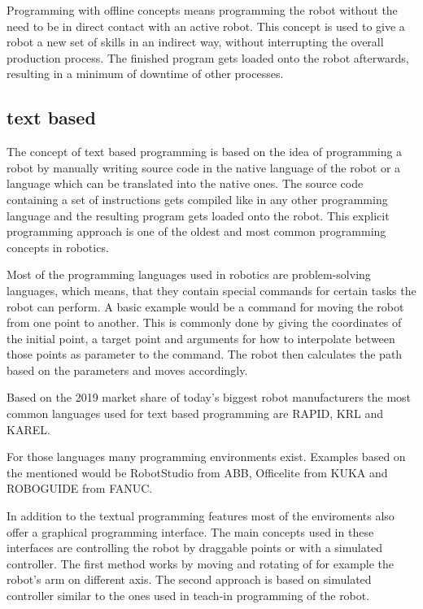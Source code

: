 \documentclass[conference]{IEEEtran}
\begin{document}
    Programming with offline concepts means programming the robot without the need to be in direct contact with an active robot. This concept is used to give a robot a new set of skills in an indirect way, without interrupting the overall production process.
    The finished program gets loaded onto the robot afterwards, resulting in a minimum of downtime of other processes. \cite[p. 186]{b4}

    \subsection{text based}

        The concept of text based programming is based on the idea of programming a robot by manually writing source code in the native language of the robot or a language which can be translated into the native ones. The source code containing a set of instructions gets compiled like in any other programming language and the resulting program gets loaded onto the robot. %
        This explicit programming approach is one of the oldest and most common programming concepts in robotics. %

        Most of the programming languages used in robotics are problem-solving languages, which means, that they contain special commands for certain tasks the robot can perform. A basic example would be a command for moving the robot from one point to another. This is commonly done by giving the coordinates of the initial point, a target point and arguments for how to interpolate between those points as parameter to the command. 
        The robot then calculates the path based on the parameters and moves accordingly. %
               
        Based on the 2019 market share of today's biggest robot manufacturers the most common languages used for text based programming are RAPID, KRL and KAREL. \cite{s1}

        For those languages many programming environments exist. Examples based on the mentioned would be RobotStudio from ABB, Officelite from KUKA and ROBOGUIDE from FANUC.

        In addition to the textual programming features most of the enviroments also offer a graphical programming interface.
        The main concepts used in these interfaces are controlling the robot by draggable points or with a simulated controller.
        The first method works by moving and rotating of for example the robot's arm on different axis. 
        The second approach is based on simulated controller similar to the ones used in teach-in programming of the robot.
\end{document}
